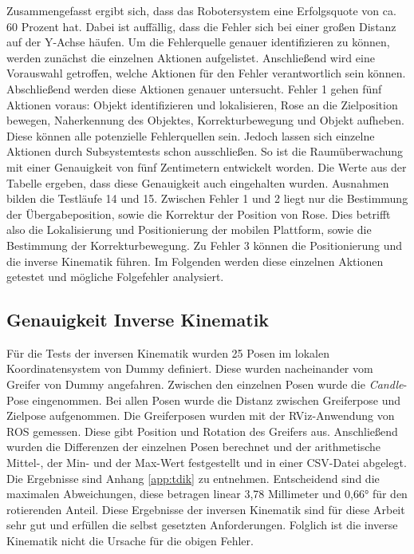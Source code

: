 Zusammengefasst ergibt sich, dass das Robotersystem eine Erfolgsquote von ca. 60 Prozent hat. Dabei ist auffällig, dass die Fehler sich bei einer großen Distanz auf der Y-Achse häufen. Um die Fehlerquelle genauer identifizieren zu können, werden zunächst die einzelnen Aktionen aufgelistet. Anschließend wird eine Vorauswahl getroffen, welche Aktionen für den Fehler verantwortlich sein können. Abschließend werden diese Aktionen genauer untersucht. Fehler 1 gehen fünf Aktionen voraus: Objekt identifizieren und lokalisieren, Rose an die Zielposition bewegen, Naherkennung des Objektes, Korrekturbewegung und Objekt aufheben. Diese können alle potenzielle Fehlerquellen sein. Jedoch lassen sich einzelne Aktionen durch Subsystemtests schon ausschließen. So ist die Raumüberwachung mit einer Genauigkeit von fünf Zentimetern entwickelt worden. Die Werte aus der Tabelle ergeben, dass diese Genauigkeit auch eingehalten wurden. Ausnahmen bilden die Testläufe 14 und 15. Zwischen Fehler 1 und 2 liegt nur die Bestimmung der Übergabeposition, sowie die Korrektur der Position von Rose. Dies betrifft also die Lokalisierung und Positionierung der mobilen Plattform, sowie die Bestimmung der Korrekturbewegung. Zu Fehler 3 können die Positionierung und die inverse Kinematik führen. Im Folgenden werden diese einzelnen Aktionen getestet und mögliche Folgefehler analysiert.

\subsection{Genauigkeit Inverse Kinematik}
\label{sec:iktest}
Für die Tests der inversen Kinematik wurden 25 Posen im lokalen Koordinatensystem von Dummy definiert. Diese wurden nacheinander vom Greifer von Dummy angefahren. Zwischen den einzelnen Posen wurde die \textit{Candle}-Pose eingenommen. Bei allen Posen wurde die Distanz zwischen Greiferpose und Zielpose aufgenommen. Die Greiferposen wurden mit der RViz-Anwendung von ROS gemessen. Diese gibt Position und Rotation des Greifers aus. Anschließend wurden die Differenzen der einzelnen Posen berechnet und der arithmetische Mittel-, der Min- und der Max-Wert festgestellt und in einer CSV-Datei abgelegt. Die Ergebnisse sind Anhang \ref{app:tdik} zu entnehmen. Entscheidend sind die maximalen Abweichungen, diese betragen linear 3,78 Millimeter und 0,66° für den rotierenden Anteil. Diese Ergebnisse der inversen Kinematik sind für diese Arbeit sehr gut und erfüllen die selbst gesetzten Anforderungen. Folglich ist die inverse Kinematik nicht die Ursache für die obigen Fehler.

